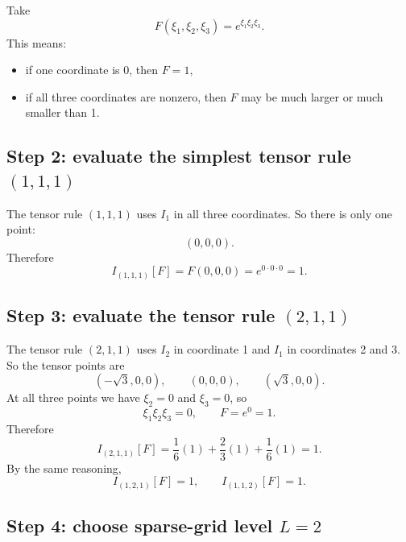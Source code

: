 \documentclass[11pt]{article}
\begin{document}
Take
\begin{equation}
  F(\xi_1,\xi_2,\xi_3)=e^{\xi_1\xi_2\xi_3}.
  \label{eq:full-example-F}
\end{equation}
This means:
\begin{itemize}[leftmargin=0.28in]
  \item if one coordinate is 0, then \(F=1\),
  \item if all three coordinates are nonzero, then \(F\) may be much larger or
  much smaller than 1.
\end{itemize}

\subsection{Step 2: evaluate the simplest tensor rule \texorpdfstring{\((1,1,1)\)}{(1,1,1)}}

The tensor rule \((1,1,1)\) uses \(I_1\) in all three coordinates.  So there is
only one point:
\[
  (0,0,0).
\]
Therefore
\begin{equation}
  I_{(1,1,1)}[F]=F(0,0,0)=e^{0\cdot 0\cdot 0}=1.
  \label{eq:I111-example}
\end{equation}

\subsection{Step 3: evaluate the tensor rule \texorpdfstring{\((2,1,1)\)}{(2,1,1)}}

The tensor rule \((2,1,1)\) uses \(I_2\) in coordinate 1 and \(I_1\) in
coordinates 2 and 3.  So the tensor points are
\[
  (-\sqrt3,0,0),\qquad (0,0,0),\qquad (\sqrt3,0,0).
\]
At all three points we have \(\xi_2=0\) and \(\xi_3=0\), so
\[
  \xi_1\xi_2\xi_3=0,
  \qquad
  F=e^0=1.
\]
Therefore
\begin{equation}
  I_{(2,1,1)}[F]
  =
  \frac16(1)+\frac23(1)+\frac16(1)=1.
  \label{eq:I211-example}
\end{equation}
By the same reasoning,
\begin{equation}
  I_{(1,2,1)}[F]=1,
  \qquad
  I_{(1,1,2)}[F]=1.
  \label{eq:I121-I112-example}
\end{equation}

\subsection{Step 4: choose sparse-grid level \texorpdfstring{\(L=2\)}{L=2}}
\end{document}
